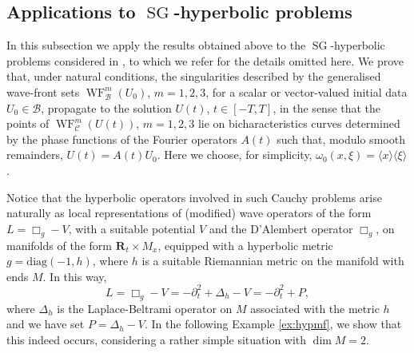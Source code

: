 \documentclass[12pt,a4paper,reqno]{amsart}
\numberwithin{equation}{section}
\numberwithin{thm}{section}
\theoremstyle{definition}
\theoremstyle{remark}
\begin{document}
\par
\subsection{Applications to ${\operatorname{SG}}$-hyperbolic problems}\label{subs:4.3}
In this subsection we apply the results obtained above to the
${\operatorname{SG}}$-hyperbolic problems considered in \cite{CoMa,CoPa}, to which
we refer for the details omitted here.
We prove that, under natural conditions, the singularities described by the generalised
wave-front sets ${\operatorname{WF}}^m_{{\mathcal B}}(U_0)$, $m=1,2,3$, for a scalar or vector-valued
initial data $U_0\in{{\mathcal B}}$, propagate to the solution $U(t)$, $t\in[-T,T]$,
in the sense that the points of ${\operatorname{WF}}^m_{{\mathcal C}}(U(t))$, $m=1,2,3$ lie on 
bicharacteristics curves determined by the phase functions
of the Fourier operators $A(t)$ such that, modulo smooth remainders,
$U(t)=A(t)U_0$. Here we choose, for simplicity, $\omega_0(x,\xi)={\langle{x}\rangle}{\langle{\xi}\rangle}$.

Notice that the hyperbolic operators involved in such Cauchy problems 
arise naturally as local representations of (modified) wave operators of the form
$L=\Box_g-V$, with a suitable potential $V$ and the D'Alembert operator
$\Box_g$, on manifolds of the form ${\mathbf R^{{}}}_t\times M_x$, equipped with a hyperbolic
metric $g=\mathrm{diag}(-1,h)$, where $h$ is a suitable Riemannian
metric on the manifold with ends $M$. In this way,
\[
	L=\Box_g-V=-\partial_t^2+\Delta_h-V=-\partial_t^2+P,
\] 
where $\Delta_h$ is the Laplace-Beltrami operator on $M$ associated with the metric $h$
and we have set $P=\Delta_h-V$.
In the following Example \ref{ex:hypmf}, we show that this indeed occurs,
considering a rather simple situation with $\dim M=2$. 
\end{document}
